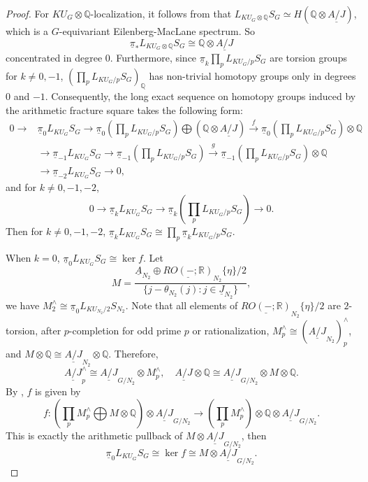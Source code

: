 \documentclass{amsart}
\theoremstyle{plain}
\theoremstyle{definition}
\theoremstyle{remark}
\begin{document}
\begin{proof}
    For $KU_G\otimes \mathbb{Q}$-localization, it follows from \cite[Lemma 9.1]{bonventre2022ku_g} that $L_{KU_G \otimes \mathbb{Q}} S_G \simeq H(\mathbb{Q} \otimes \underline{A/J})$, which is a $G$-equivariant Eilenberg-MacLane spectrum. So 
    \[
    \underline{\pi}_* L_{KU_G \otimes \mathbb{Q}} S_G \cong \mathbb{Q} \otimes \underline{A/J}   
    \]
    concentrated in degree $0$. Furthermore, since $\underline{\pi}_k \prod_{p} L_{KU_G/p} S_G$ are torsion groups for $k \neq 0, -1$, $(\prod_{p} L_{KU_G/p} S_G)_{\mathbb{Q}}$ has non-trivial homotopy groups only in degrees $0$ and $-1$. Consequently, the long exact sequence on homotopy groups induced by the arithmetic fracture square takes the following form:
    \[
    \begin{aligned}
        0\to & \underline{\pi}_0 L_{KU_G}S_G \to \underline{\pi}_0(\prod_{p} L_{KU_G/p} S_G)\bigoplus (\mathbb{Q}\otimes \underline{A/J}) \overset{f}{\longrightarrow} \underline{\pi}_0(\prod_{p} L_{KU_G/p} S_G)\otimes \mathbb{Q} \\
        & \to \underline{\pi}_{-1}L_{KU_G}S_G \to \underline{\pi}_{-1}(\prod_{p} L_{KU_G/p} S_G) \overset{g}{\longrightarrow} \underline{\pi}_{-1}(\prod_{p} L_{KU_G/p} S_G)\otimes \mathbb{Q} \\
        & \to \underline{\pi}_{-2}L_{KU_G}S_G \to 0,
    \end{aligned}
    \] 
    and for $k\neq 0,-1,-2$, 
    \[
    0\to \underline{\pi}_{k}L_{KU_G}S_G \to \underline{\pi}_{k}(\prod_{p} L_{KU_G/p} S_G)\to 0.
    \]
    Then for $k\neq 0,-1,-2$, $\underline{\pi}_kL_{KU_G}S_G\cong\prod_p \underline{\pi}_kL_{KU_G/p}S_G$. 

    When $k=0$, $\underline{\pi}_0 L_{KU_G}S_G\cong \ker f$. Let 
    $$M=\frac{\underline{A}_{N_2} \oplus \underline{RO(-;\mathbb{R})}_{N_2}\{\eta\}/2}{\{j-\theta_{N_2}(j):j\in \underline{J}_{N_2}\}},$$
    we have $M_2^\wedge \cong \underline{\pi}_0 L_{KU_{N_2}/2}S_{N_2}$. Note that all elements of $\underline{RO(-;\mathbb{R})}_{N_2}\{\eta\}/2$ are $2$-torsion, after $p$-completion for odd prime $p$ or rationalization, $M_p^\wedge \cong (\underline{A/J}_{N_2})_p^\wedge$, and $M\otimes \mathbb{Q}\cong \underline{A/J}_{N_2}\otimes \mathbb{Q}$. Therefore,
    \[
    \underline{A/J}_p^\wedge \cong \underline{A/J}_{G/N_2} \otimes M_p^\wedge, \quad \underline{A/J}\otimes \mathbb{Q} \cong \underline{A/J}_{G/N_2} \otimes M\otimes \mathbb{Q}.
    \]
    By , $f$ is given by 
    \[
    f : (\prod_p M_p^\wedge \bigoplus M\otimes \mathbb{Q})\otimes \underline{A/J}_{G/N_2} \to (\prod_p M_p^\wedge )\otimes \mathbb{Q} \otimes \underline{A/J}_{G/N_2}.
    \]
    This is exactly the arithmetic pullback of $ M\otimes \underline{A/J}_{G/N_2}$, then
    \[\underline{\pi}_0 L_{KU_G}S_G\cong \ker f \cong  M\otimes \underline{A/J}_{G/N_2}.\]


\end{proof}
\end{document}
